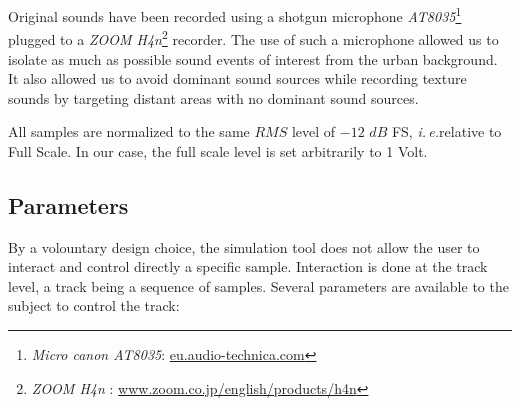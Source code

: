 \documentclass[preprint,12pt]{elsarticle}
\newcommand{\ie}{\emph{i.\,e.}}
\begin{document}

Original sounds have been recorded using a shotgun microphone \emph{AT8035}\footnote{\emph{Micro canon AT8035}: \url{eu.audio-technica.com}} plugged to a \emph{ZOOM H4n}\footnote{\emph{ZOOM H4n} : \url{www.zoom.co.jp/english/products/h4n}} recorder. The use of such a microphone allowed us to isolate as much as possible sound events of interest from the urban background. It also allowed us to avoid dominant sound sources while recording texture sounds by targeting distant areas with no dominant sound sources.


All samples are normalized to the same $RMS$ level of $-12$ $dB$ FS, \ie relative to Full Scale. In our case, the full scale level is set arbitrarily to 1 Volt.

\subsection{Parameters}
\label{sec:simscene_parametre}


By a volountary design choice, the simulation tool does not allow the user to interact and control directly a specific sample. Interaction is done at the track level, a track being a sequence of samples. Several parameters are available to the subject to control the track:

\end{document}

